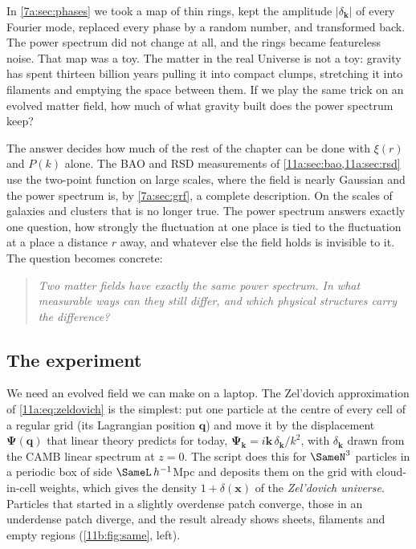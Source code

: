 In \cref{7a:sec:phases} we took a map of thin rings, kept the amplitude
$|\delta_{\bm k}|$ of every Fourier mode, replaced every phase by a random number,
and transformed back. The power spectrum did not change at all, and the rings
became featureless noise. That map was a toy. The matter in the real Universe
is not a toy: gravity has spent thirteen billion years pulling it into compact
clumps, stretching it into filaments and emptying the space between them. If we
play the same trick on an evolved matter field, how much of what gravity built
does the power spectrum keep?

The answer decides how much of the rest of the chapter can be done with $\xi(r)$
and $P(k)$ alone. The BAO and RSD measurements of \cref{11a:sec:bao,11a:sec:rsd}
use the two-point function on large scales, where the field is nearly Gaussian
and the power spectrum is, by \cref{7a:sec:grf}, a complete description. On the
scales of galaxies and clusters that is no longer true. The power spectrum answers
exactly one question, how strongly the fluctuation at one place is tied to the
fluctuation at a place a distance $r$ away, and whatever else the field holds is
invisible to it. The question becomes concrete:
\begin{quote}
\emph{Two matter fields have exactly the same power spectrum. In what measurable
ways can they still differ, and which physical structures carry the
difference?}
\end{quote}

\subsection{The experiment}
\label{11b:sec:same-experiment}

We need an evolved field we can make on a laptop. The Zel'dovich approximation of
\eqref{11a:eq:zeldovich} is the simplest: put one particle at the centre of every
cell of a regular grid (its Lagrangian position $\bm q$) and move it by the
displacement $\bm\Psi(\bm q)$ that linear theory predicts for today,
$\bm\Psi_{\bm k}=i\bm k\,\delta_{\bm k}/k^2$, with $\delta_{\bm k}$ drawn from the
CAMB linear spectrum at $z=0$. The script  does this
for $\SameN^3$ particles in a periodic box of side $\SameL\,h^{-1}$Mpc and
deposits them on the grid with cloud-in-cell weights, which gives the density
$1+\delta(\bm x)$ of the \emph{Zel'dovich universe}. Particles that started in a
slightly overdense patch converge, those in an underdense patch diverge, and the
result already shows sheets, filaments and empty regions (\cref{11b:fig:same},
left).

